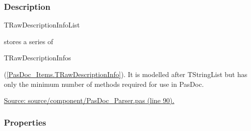 \documentclass{report}
\begin{document}
\subsubsection*{\large{\textbf{Description}}\normalsize\hspace{1ex}\hfill}
\begin{ttfamily}TRawDescriptionInfoList\end{ttfamily} stores a series of \begin{ttfamily}TRawDescriptionInfos\end{ttfamily}(\ref{PasDoc_Items.TRawDescriptionInfo}). It is modelled after TStringList but has only the minimum number of methods required for use in PasDoc.\par
\href{https://github.com/pasdoc/pasdoc/blob/master/source/component/PasDoc_Parser.pas#L90}{Source: source/component/PasDoc{\_}Parser.pas (line 90).}\subsubsection*{\large{\textbf{Properties}}\normalsize\hspace{1ex}\hfill}
\end{document}
